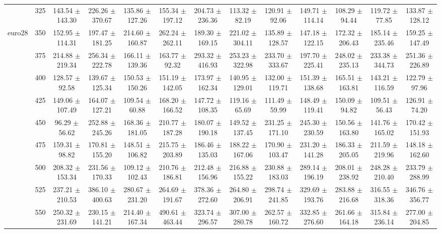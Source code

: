 \begin{table}[h]
{\begin{tabular}{
        ccccccccccccc}
 & 325& 143.54 $\pm$ 143.30& 226.26 $\pm$ 370.67& 135.86 $\pm$ 127.26& 155.34 $\pm$ 197.12& 204.73 $\pm$ 236.36& 113.32 $\pm$ 82.19& 120.91 $\pm$ 92.06& 149.71 $\pm$ 114.14& 108.29 $\pm$ 94.44& 119.72 $\pm$ 77.85& 133.87 $\pm$ 128.12 \\ 
\multirow{4}{*}{euro28}& 350& 152.95 $\pm$ 114.31& 197.47 $\pm$ 181.25& 214.60 $\pm$ 160.87& 262.24 $\pm$ 262.11& 189.30 $\pm$ 169.15& 221.02 $\pm$ 304.11& 135.89 $\pm$ 128.57& 147.18 $\pm$ 122.15& 172.32 $\pm$ 206.43& 185.14 $\pm$ 235.46& 159.25 $\pm$ 147.49 \\ 
 & 375& 214.88 $\pm$ 219.34& 256.34 $\pm$ 222.78& 166.11 $\pm$ 139.36& 163.77 $\pm$ 92.32& 293.32 $\pm$ 416.93& 253.23 $\pm$ 322.98& 233.70 $\pm$ 333.67& 197.70 $\pm$ 225.41& 248.02 $\pm$ 235.13& 233.38 $\pm$ 344.73& 251.36 $\pm$ 226.89 \\ 
 & 400& 128.57 $\pm$ 92.58& 139.67 $\pm$ 125.34& 150.53 $\pm$ 150.26& 151.19 $\pm$ 142.05& 173.97 $\pm$ 162.34& 140.95 $\pm$ 129.01& 132.00 $\pm$ 119.71& 151.39 $\pm$ 138.68& 165.51 $\pm$ 163.81& 143.21 $\pm$ 116.59& 122.79 $\pm$ 97.96 \\ 
 & 425& 149.06 $\pm$ 107.49& 164.07 $\pm$ 127.21& 109.54 $\pm$ 60.88& 168.20 $\pm$ 166.52& 147.72 $\pm$ 108.35& 119.16 $\pm$ 65.69& 111.49 $\pm$ 59.99& 148.49 $\pm$ 119.41& 150.09 $\pm$ 94.82& 109.51 $\pm$ 56.43& 126.91 $\pm$ 74.20 \\ 
 & 450& 96.29 $\pm$ 56.62& 252.88 $\pm$ 245.26& 168.36 $\pm$ 181.05& 210.77 $\pm$ 187.28& 180.07 $\pm$ 190.18& 149.52 $\pm$ 137.45& 231.25 $\pm$ 171.10& 245.30 $\pm$ 230.59& 150.56 $\pm$ 163.80& 141.76 $\pm$ 165.02& 170.42 $\pm$ 151.93 \\ 
 & 475& 159.31 $\pm$ 98.82& 170.81 $\pm$ 155.20& 148.51 $\pm$ 106.82& 215.75 $\pm$ 203.89& 186.46 $\pm$ 135.03& 188.22 $\pm$ 167.06& 170.90 $\pm$ 103.47& 231.20 $\pm$ 141.28& 186.33 $\pm$ 205.05& 211.59 $\pm$ 219.96& 148.18 $\pm$ 162.60 \\ 
 & 500& 208.32 $\pm$ 153.34& 231.56 $\pm$ 170.33& 109.12 $\pm$ 102.43& 210.76 $\pm$ 186.81& 212.48 $\pm$ 156.96& 216.88 $\pm$ 155.22& 230.88 $\pm$ 183.03& 289.14 $\pm$ 196.19& 208.01 $\pm$ 238.92& 248.28 $\pm$ 210.40& 233.79 $\pm$ 288.99 \\ 
 & 525& 237.21 $\pm$ 210.53& 386.10 $\pm$ 400.63& 280.67 $\pm$ 231.20& 264.69 $\pm$ 191.67& 378.36 $\pm$ 272.60& 264.80 $\pm$ 206.91& 298.74 $\pm$ 241.85& 329.69 $\pm$ 193.76& 283.88 $\pm$ 216.68& 316.55 $\pm$ 318.36& 346.76 $\pm$ 356.77 \\ 
 & 550& 250.32 $\pm$ 231.69& 230.15 $\pm$ 141.21& 214.40 $\pm$ 167.34& 490.61 $\pm$ 463.44& 323.74 $\pm$ 296.57& 307.00 $\pm$ 280.78& 262.57 $\pm$ 160.72& 332.85 $\pm$ 276.60& 261.66 $\pm$ 164.18& 315.84 $\pm$ 236.14& 277.00 $\pm$ 204.85 \\ 

\end{tabular}}
\end{table}
